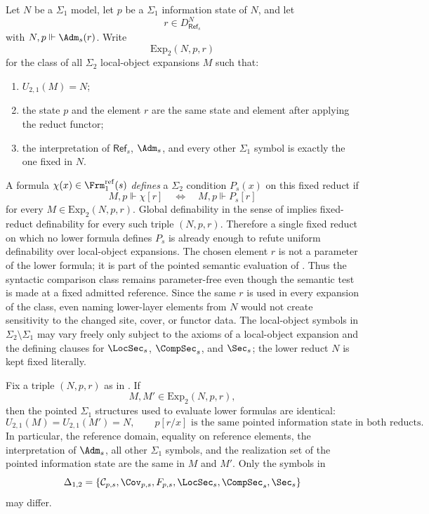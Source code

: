 \begin{definition}\label{def:fixed-reduct-comparison-class}
Let $N$ be a $\Sigma_1$ model, let $p$ be a $\Sigma_1$ information state of $N$, and let
\[
r\in D_{\mathsf{Ref}_s}^{N}
\]
with $N,p\Vdash\Adm_s(r)$. Write
\[
\mathrm{Exp}_2(N,p,r)
\]
for the class of all $\Sigma_2$ local-object expansions $M$ such that:
\begin{enumerate}[label=(\roman*),nosep]
\item $U_{2,1}(M)=N$;
\item the state $p$ and the element $r$ are the same state and element after applying the reduct functor;
\item the interpretation of $\mathsf{Ref}_s$, $\Adm_s$, and every other $\Sigma_1$ symbol is exactly the one fixed in $N$.
\end{enumerate}
A formula $\chi(x)\in\Frm_1^{\mathrm{ref}}(s)$ \emph{defines} a $\Sigma_2$ condition $P_s(x)$ on this fixed reduct if
\[
M,p\Vdash\chi[r]
\quad\Longleftrightarrow\quad
M,p\Vdash P_s[r]
\]
for every $M\in\mathrm{Exp}_2(N,p,r)$. Global definability in the sense of  implies fixed-reduct definability for every such triple $(N,p,r)$. Therefore a single fixed reduct on which no lower formula defines $P_s$ is already enough to refute uniform definability over local-object expansions.
The chosen element $r$ is not a parameter of the lower formula; it is part of the pointed semantic evaluation of . Thus the syntactic comparison class remains parameter-free even though the semantic test is made at a fixed admitted reference. Since the same $r$ is used in every expansion of the class, even naming lower-layer elements from $N$ would not create sensitivity to the changed site, cover, or functor data.
The local-object symbols in $\Sigma_2\setminus\Sigma_1$ may vary freely only subject to the axioms of a local-object expansion and the defining clauses for $\LocSec_s$, $\CompSec_s$, and $\Sec_s$; the lower reduct $N$ is kept fixed literally.
\end{definition}

\begin{lemma}\label{lem:fixed-comparison-lower-rigidity}
Fix a triple $(N,p,r)$ as in . If
\[
M,M'\in \mathrm{Exp}_2(N,p,r),
\]
then the pointed $\Sigma_1$ structures used to evaluate lower formulas are identical:
\[
U_{2,1}(M)=U_{2,1}(M')=N,
\qquad
p[r/x]\text{ is the same pointed information state in both reducts}.
\]
In particular, the reference domain, equality on reference elements, the interpretation of $\Adm_s$, all other $\Sigma_1$ symbols, and the realization set of the pointed information state are the same in $M$ and $M'$. Only the symbols in
\[
\Delta_{1,2}=\{\mathcal C_{p,s},\Cov_{p,s},F_{p,s},\LocSec_s,\CompSec_s,\Sec_s\}
\]
may differ.
\end{lemma}

